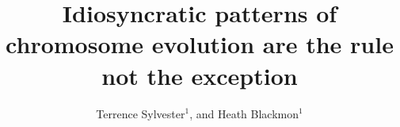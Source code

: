 \documentclass[]{rsos}%
\begin{document}
\title{Idiosyncratic patterns of chromosome evolution are the rule not the exception}

\author{%
Terrence Sylvester$^{1}$, and Heath Blackmon$^{1}$}

\address{$^{1}$Department of Biology; Texas A\&M University; College Station, TX 77843, USA}


\subject{Evolutionary Biology}


\end{document}
